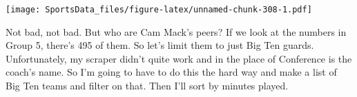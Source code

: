 \documentclass[
]{book}
\newenvironment{Shaded}{\begin{snugshade}}{\end{snugshade}}
\newcommand{\DecValTok}[1]{\textcolor[rgb]{0.00,0.00,0.81}{#1}}
\newcommand{\KeywordTok}[1]{\textcolor[rgb]{0.13,0.29,0.53}{\textbf{#1}}}
\newcommand{\NormalTok}[1]{#1}
\newcommand{\OperatorTok}[1]{\textcolor[rgb]{0.81,0.36,0.00}{\textbf{#1}}}
\newcommand{\StringTok}[1]{\textcolor[rgb]{0.31,0.60,0.02}{#1}}
\begin{document}
\texttt{[image: SportsData\_files/figure-latex/unnamed-chunk-308-1.pdf]}

Not bad, not bad. But who are Cam Mack's peers? If we look at the numbers in Group 5, there's 495 of them. So let's limit them to just Big Ten guards. Unfortunately, my scraper didn't quite work and in the place of Conference is the coach's name. So I'm going to have to do this the hard way and make a list of Big Ten teams and filter on that. Then I'll sort by minutes played.

\begin{Shaded}
\end{Shaded}
\end{document}
